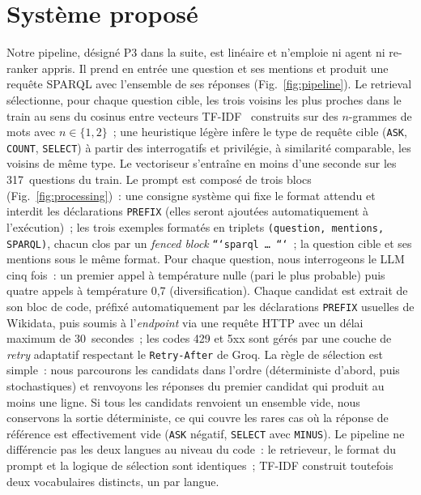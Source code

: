 \documentclass[]{ceurart}
\begin{document}
\section{Système proposé}
\label{sec:method}
Notre pipeline, désigné P3 dans la suite, est linéaire et n'emploie ni agent ni re-ranker appris. Il prend en entrée une question et ses mentions et produit une requête SPARQL avec l'ensemble de ses réponses (Fig.~\ref{fig:pipeline}). Le retrieval sélectionne, pour chaque question cible, les trois voisins les plus proches dans le train au sens du cosinus entre vecteurs TF-IDF~\cite{salton1988term} construits sur des $n$-grammes de mots avec $n\in\{1,2\}$~; une heuristique légère infère le type de requête cible (\texttt{ASK}, \texttt{COUNT}, \texttt{SELECT}) à partir des interrogatifs et privilégie, à similarité comparable, les voisins de même type. Le vectoriseur s'entraîne en moins d'une seconde sur les \num{317}~questions du train. Le prompt est composé de trois blocs (Fig.~\ref{fig:processing})~: une consigne système qui fixe le format attendu et interdit les déclarations \texttt{PREFIX} (elles seront ajoutées automatiquement à l'exécution)~; les trois exemples formatés en triplets \texttt{(question, mentions, SPARQL)}, chacun clos par un \emph{fenced block} \texttt{```sparql~\dots~```}~; la question cible et ses mentions sous le même format. Pour chaque question, nous interrogeons le LLM cinq fois~: un premier appel à température nulle (pari le plus probable) puis quatre appels à température 0{,}7 (diversification). Chaque candidat est extrait de son bloc de code, préfixé automatiquement par les déclarations \texttt{PREFIX} usuelles de Wikidata, puis soumis à l'\emph{endpoint} via une requête HTTP avec un délai maximum de 30~secondes~; les codes 429 et 5xx sont gérés par une couche de \emph{retry} adaptatif respectant le \texttt{Retry-After} de Groq. La règle de sélection est simple~: nous parcourons les candidats dans l'ordre (déterministe d'abord, puis stochastiques) et renvoyons les réponses du premier candidat qui produit au moins une ligne. Si tous les candidats renvoient un ensemble vide, nous conservons la sortie déterministe, ce qui couvre les rares cas où la réponse de référence est effectivement vide (\texttt{ASK} négatif, \texttt{SELECT} avec \texttt{MINUS}). Le pipeline ne différencie pas les deux langues au niveau du code~: le retrieveur, le format du prompt et la logique de sélection sont identiques~; TF-IDF construit toutefois deux vocabulaires distincts, un par langue.
\end{document}

